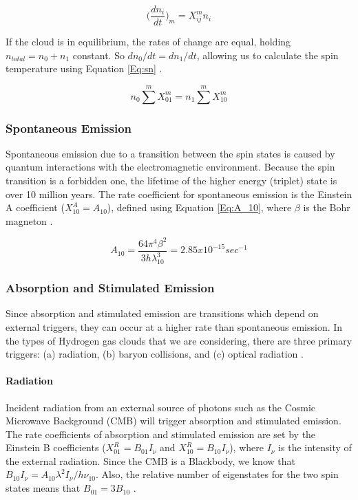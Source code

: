 \begin{equation} \label{Eq:dn}
\Big( \frac{d n_i}{dt} \Big)_m = X^m_{ij} n_i
\end{equation}

If the cloud is in equilibrium, the rates of change are equal, holding $n_{total} = n_0 + n_1$ constant. So $d n_0/dt = d n_1 /dt$, allowing us to calculate the spin temperature using Equation \ref{Eq:sn} \cite{field_1958}. 

\begin{equation} \label{Eq:sn}
n_0 \sum^m X^m_{01} = n_1 \sum^m X^m_{10}
\end{equation}

\subsubsection{Spontaneous Emission}

Spontaneous emission due to a transition between the spin states is caused by quantum interactions with the electromagnetic environment. Because the spin transition is a forbidden one, the lifetime of the higher energy (triplet) state is over 10 million years. The rate coefficient for spontaneous emission is the Einstein A coefficient ($X^A_{10} = A_{10}$), defined using Equation \ref{Eq:A_10}, where $\beta$ is the Bohr magneton \cite{field_1958}. 


\begin{equation} \label{Eq:A_10}
A_{10} = \frac{64 \pi^4 \beta^2}{3 h \lambda^3_{10}} = 2.85 x 10^{-15} sec^{-1}
\end{equation}


\subsubsection{Absorption and Stimulated Emission}

Since absorption and stimulated emission are transitions which depend on external triggers, they can occur at a higher rate than spontaneous emission. In the types of Hydrogen gas clouds that we are considering, there are three primary triggers: (a) \cm radiation, (b) baryon collisions, and (c) optical radiation \cite{field_1958}. 

\paragraph{\cm Radiation}

Incident radiation from an external source of \cm photons such as the Cosmic Microwave Background (CMB) will trigger absorption and stimulated emission. The rate coefficients of absorption and stimulated emission are set by the Einstein B coefficients ($X^R_{01} = B_{01} I_\nu$ and $X^R_{10} = B_{10} I_{\nu}$), where $I_{\nu}$ is the intensity of the external radiation. Since the CMB is a Blackbody, we know that $B_{10} I_{\nu} = A_{10} \lambda^2 I_{\nu}/ h \nu_{10}$. Also, the relative number of eigenstates for the two spin states means that $B_{01} = 3 B_{10}$ \cite{field_1958}. 


